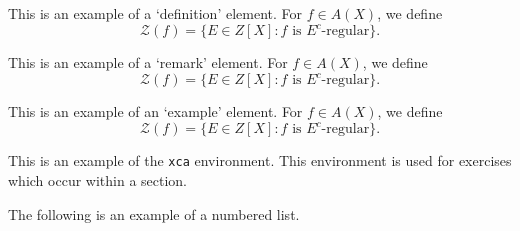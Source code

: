 \begin{definition}
This is an example of a `definition' element.
For $f\in A(X)$, we define
\begin{equation}
\mathcal{Z} (f)=\{E\in Z[X]: \text{$f$ is $E^c$-regular}\}.
\end{equation}
\end{definition}

\begin{remark}
This is an example of a `remark' element.
For $f\in A(X)$, we define
\begin{equation}
\mathcal{Z} (f)=\{E\in Z[X]: \text{$f$ is $E^c$-regular}\}.
\end{equation}
\end{remark}

\begin{example}
This is an example of an `example' element.
For $f\in A(X)$, we define
\begin{equation}
\mathcal{Z} (f)=\{E\in Z[X]: \text{$f$ is $E^c$-regular}\}.
\end{equation}
\end{example}

\begin{xca}
This is an example of the \texttt{xca} environment. This environment is
used for exercises which occur within a section.
\end{xca}

The following is an example of a numbered list.

